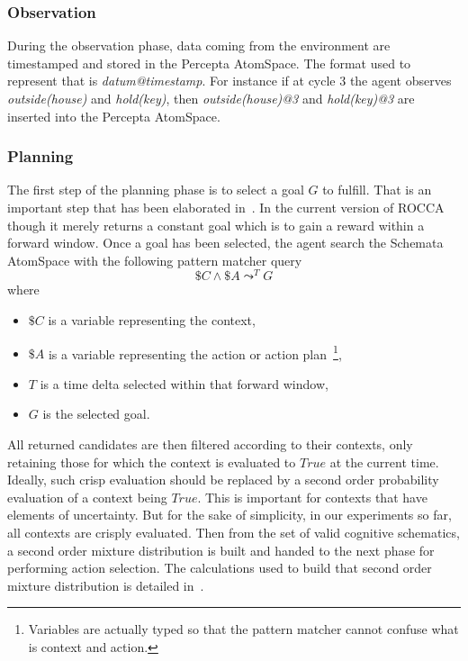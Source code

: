 \documentclass[runningheads]{llncs}
\newcommand{\TTrue}{\textit{True}}
\newcommand{\lpreimp}[1]{\leadsto^{#1}}
\begin{document}
\subsubsection{Observation}
During the observation phase, data coming from the environment are
timestamped and stored in the Percepta AtomSpace.  The format used to
represent that is \textit{datum@timestamp}.  For instance if at cycle
3 the agent observes \textit{outside(house)} and \textit{hold(key)},
then \textit{outside(house)@3} and \textit{hold(key)@3}
are inserted into the Percepta AtomSpace.

\subsubsection{Planning}
The first step of the planning phase is to select a goal $G$ to
fulfill.  That is an important step that has been elaborated
in~\cite{Goertzel2014EGI1, Hahm2021}.  In the current version of ROCCA
though it merely returns a constant goal which is to gain a reward
within a forward window.  Once a goal has been selected, the agent
search the Schemata AtomSpace with the following pattern matcher query
$$\$C \land \$A \lpreimp{T} G$$
where
\begin{itemize}
\item $\$C$ is a variable representing the context,
\item $\$A$ is a variable representing the action or action
  plan~\footnote{Variables are actually typed so that the pattern
    matcher cannot confuse what is context and action.},
\item $T$ is a time delta selected within that forward window,
\item $G$ is the selected goal.
\end{itemize}
All returned candidates are then filtered according to their contexts,
only retaining those for which the context is evaluated to $\TTrue$ at
the current time.  Ideally, such crisp evaluation should be replaced
by a second order probability evaluation of a context being $\TTrue$.
This is important for contexts that have elements of uncertainty.  But
for the sake of simplicity, in our experiments so far, all contexts
are crisply evaluated.  Then from the set of valid cognitive
schematics, a second order mixture distribution is built and handed to
the next phase for performing action selection.  The calculations used
to build that second order mixture distribution is detailed
in~\cite{Geisweiller2018}.
\end{document}
